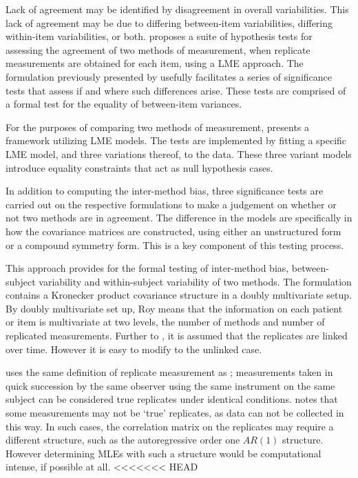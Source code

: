 \documentclass[12pt, a4paper]{report}
\theoremstyle{plain}
\theoremstyle{definition}
\theoremstyle{remark}
\begin{document}
Lack of agreement may be identified by disagreement in overall variabilities. This lack of agreement may be due to differing between-item variabilities, differing within-item variabilities, or both. \citet{ARoy2009} proposes a suite of hypothesis tests for assessing the agreement of two methods of measurement, when replicate measurements are obtained for each item, using a LME approach. The formulation previously presented by \citet{ARoy2009} usefully facilitates a series of significance tests that assess if and where such differences arise. These tests are comprised of a formal test for the equality of between-item variances.


For the purposes of comparing two methods of measurement, \citet{ARoy2009} presents a framework utilizing LME models. The tests are implemented by fitting a specific LME model, and three variations thereof, to the data. These three variant models introduce equality constraints that act as null hypothesis cases.

In addition to computing the inter-method bias, three significance tests are carried out on the respective formulations to make a judgement on whether or not two methods are in agreement. The difference in the models are specifically in how the covariance matrices are constructed, using either an unstructured form or a compound symmetry form. This is a key component of this testing process.

This approach provides for the formal testing of inter-method bias, between-subject variability and within-subject variability of two methods. The formulation contains a Kronecker product covariance structure in a doubly multivariate setup. By doubly multivariate set up, Roy means that the information on each patient or item is multivariate at two levels, the number of methods and number of replicated measurements. Further to \citet{lam}, it is assumed that the replicates are linked over time. However it is easy to modify to the unlinked case.

\citet{ARoy2009} uses the same definition of replicate measurement as \citet{BA99}; measurements taken in quick succession by the same observer using the same instrument on the same subject can be considered true replicates under identical conditions.
\citet{ARoy2009} notes that some measurements may not be `true' replicates, as data can not be collected in this way. In such cases, the correlation matrix on the replicates may require a different structure, such as the autoregressive order one $AR(1)$ structure. However determining MLEs with such a structure would be computational intense, if possible at all.
<<<<<<< HEAD
	
\end{document}
